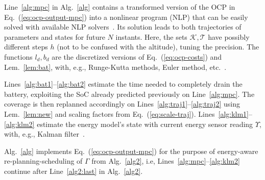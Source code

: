 \documentclass[letterpaper,10pt,journal,twoside]{IEEEtran}
\theoremstyle{definition}
\begin{document}
Line~\ref{alg:mpc} in Alg.~\ref{alg} contains a transformed version of the OCP in Eq.~(\ref{eq:ocp-output-mpc}) into a nonlinear program (NLP) that can be easily solved with available NLP solvers~\cite{rawlings2017model}. Its solution leads to both trajectories of parameters and states for future $N$ instants. Here, the sets $\mathcal{K},\mathcal{T}$ have possibly different steps $h$ (not to be confused with the altitude), tuning the precision. The functions $l_d,b_d$ are the discretized versions of Eq.~(\ref{eq:ocp-costs}) and Lem.~\ref{lem:bat}, with, e.g., Runge-Kutta methods, Euler method, etc.~\cite{iserles2009first}.

Lines~\ref{alg:bat1}--\ref{alg:bat2} estimate the time needed to completely drain the battery, exploiting the SoC already predicted previously on Line~\ref{alg:mpc}. The coverage is then replanned accordingly on Lines~\ref{alg:traj1}--\ref{alg:traj2} using Lem.~\ref{lem:new} and scaling factors from Eq.~(\ref{eq:scale-traj}). Lines~\ref{alg:klm1}--\ref{alg:klm2} estimate the energy model's state with current energy sensor reading $\Upsilon$, with, e.g., %
Kalman filter~\cite{kalman1960new}.

Alg.~\ref{alg} implements Eq.~(\ref{eq:ocp-output-mpc}) for the purpose of energy-aware re-planning-scheduling of $\Gamma$ from Alg.~\ref{alg2}, i.e, Lines~\ref{alg:mpc}--\ref{alg:klm2} continue after Line~\ref{alg2:last} in Alg.~\ref{alg2}.





\end{document}
